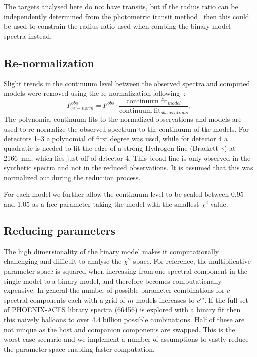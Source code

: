 \documentclass[fleqn,usenatbib]{mnras}
\newcommand*\bl{\color{blue}}
\begin{document}
The targets analysed here do not have transits, but if the radius ratio can be independently determined from the photometric transit method~\citep{deeg_photometric_1998} then this could be used to constrain the radius ratio used when combing the binary model spectra instead.

\subsection{Re-normalization}
\label{subsec:renorm}
Slight trends in the continuum level between the observed spectra and computed models were removed using the re-normalization following~\citep{passegger_fundamental_2016}:
\begin{equation}
F^{obs}_{re-norm} = F^{obs} \cdot \frac{\textrm{continuum fit}_{model}}{\textrm{continuum fit}_{observations}}.
\end{equation}
The polynomial continuum fits to the normalized observations and models are used to re-normalize the observed spectrum to the continuum of the models. For detectors 1--3 a polynomial of first degree was used, while for detector 4 a quadratic is needed to fit the edge of a strong Hydrogen line (Brackett-\(\gamma\)) at 2166~nm, which lies just off of detector 4. This broad line is only observed in the synthetic spectra and not in the reduced observations. It is assumed that this was normalized out during the reduction process.

For each model we further allow the continuum level to be {\bl scaled between 0.95 and 1.05 as a free parameter} taking the model with the smallest \(\chi^2\) value.

\subsection{Reducing parameters}
\label{subsec:reduce-params}
The high dimensionality of the binary model makes it computationally challenging and difficult to analyse the \(\chi^2\) space.
For reference, the multiplicative parameter space is squared when increasing from one spectral component in the single model to a binary model, and therefore becomes computationally expensive. In general the number of possible parameter combinations for \(c\) spectral components each with a grid of \(m\) models increases to \(c^m\). If the full set of PHOENIX-ACES library spectra (66456) is explored with a binary fit then this naively balloons to over 4.4 billion possible combinations. Half of these are not unique as the host and companion components are swapped. This is the worst case scenario and we implement a number of assumptions to vastly reduce the parameter-space enabling faster computation.
\end{document}
